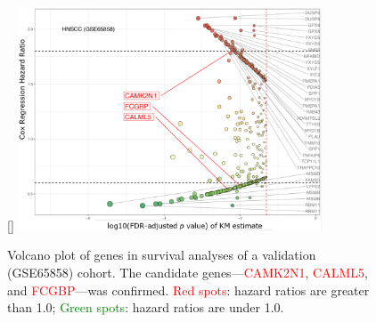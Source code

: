 \documentclass[
paper=landscape,
paper=160mm:90mm, %
fontsize=11pt, %
pagesize, %
parskip=half-, %
]{scrartcl} %
\theoremstyle{mythmstyle} %
\begin{document}
\clearpage
\begin{figure}[ht]

[\FBwidth]
{    \includegraphics[width=9cm]{Rplot_GSE65858_CoxHR_CAMK2N1_top3FDRKM.pdf}}
{    \caption{Volcano plot of genes in survival analyses of a validation (GSE65858) cohort.
The candidate genes---\textcolor{red}{CAMK2N1}, \textcolor{red}{CALML5}, and \textcolor{red}{FCGBP}---was confirmed.
    \textcolor{red}{Red spots}: hazard ratios are greater than 1.0;
    \textcolor{green}{Green spots}: hazard ratios are under 1.0.
    }}
\end{figure}
\end{document}

